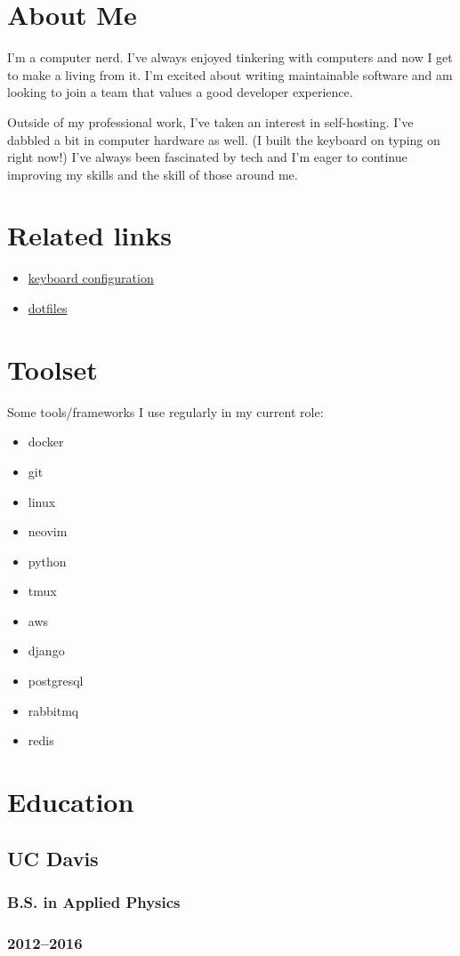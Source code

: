 \documentclass{article}
\begin{document}
\begin{minipage}[t]{.3\textwidth}
	\section*{About Me}
	I'm a computer nerd. I've always enjoyed tinkering with computers and now I
	get to make a living from it. I'm excited about writing maintainable
	software and am looking to join a team that values a good developer
	experience.

	Outside of my professional work, I've taken an interest in self-hosting.
	I've dabbled a bit in computer hardware as well. (I built the keyboard on
	typing on right now!) I've always been fascinated by tech and I'm eager to
	continue improving my skills and the skill of those around me.

	\vspace{1em}
	\section*{Related links}
	\begin{itemize}
		\item \href{https://github.com/alejandro-angulo/zmk-config}{keyboard configuration}
		\item \href{https://github.com/alejandro-angulo/dotfiles/}{dotfiles}
	\end{itemize}
	\section*{Toolset}
	Some tools/frameworks I use regularly in my current role:
	\vspace{-0.6em}
	\begin{itemize}
		\item docker
		\item git
		\item linux
		\item neovim
		\item python
		\item tmux
		\item aws
		\item django
		\item postgresql
		\item rabbitmq
		\item redis
	\end{itemize}
	\section*{Education}
	\subsection*{UC Davis}
	\subsubsection*{B.S. in Applied Physics}
	\subsubsection*{2012--2016}
\end{minipage}
\end{document}
